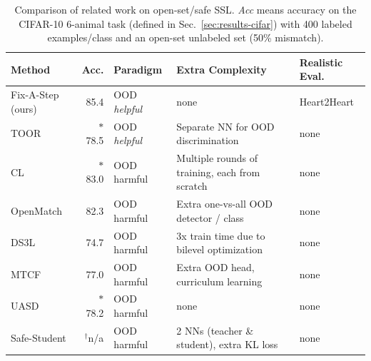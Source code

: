 \setlength{\tabcolsep}{.24cm}
\begin{table}[!t]
\begin{tabular}{l r  l l l}
Method & Acc. & Paradigm 
	& Extra Complexity & Realistic Eval.
\\ \hline
Fix-A-Step (ours) 
	& 85.4 %
	& OOD \emph{helpful}
	& none
	& Heart2Heart
\\
TOOR {\tiny \citep{huangTheyAreNot2022}}
	& $*$78.5 %
	& OOD \emph{helpful}
	& Separate NN for OOD discrimination
	& none
\\
CL {\tiny{\citep{cascante-bonillaCurriculumLabelingRevisiting2021}}}
	& $*$83.0
	& OOD harmful %
	& Multiple rounds of training, each from scratch
	& none
\\
OpenMatch {\tiny{\citep{saitoOpenMatchOpensetConsistency2021}}}
	& 82.3 %
	& OOD harmful
	& Extra one-vs-all OOD detector / class
	& none
\\
DS3L {\tiny \citep{guoSafeDeepSemiSupervised2020}}
	& 74.7 %
	& OOD harmful
	& 3x train time due to bilevel optimization
	& none
\\
MTCF {\tiny \citep{yuMultiTaskCurriculumFramework2020}}
	& 77.0 %
	& OOD harmful
	& Extra OOD head, curriculum learning
	& none
\\
UASD {\tiny \citep{chenSemiSupervisedLearningClass2020}}
	& $*$78.2 %
	& OOD harmful
	& none
	& none
\\
Safe-Student
	{\tiny{\citep{heSafeStudentSafeDeep2022}}}
	& $^{\dagger}$n/a
	& OOD harmful
	& 2 NNs (teacher \& student), extra KL loss
	& none
\end{tabular}
\caption{Comparison of related work on open-set/safe SSL.
\emph{Acc} means accuracy on the CIFAR-10 6-animal task (defined in Sec.~\ref{sec:results-cifar}) with 400 labeled examples/class and an open-set unlabeled set (50\% mismatch).
}
\end{table}
